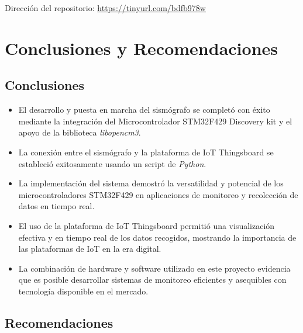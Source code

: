 \documentclass[12pt,a4paper]{article}
\begin{document}
Dirección del repositorio: \url{https://tinyurl.com/bdfb978w}


\newpage



\newpage



\newpage

\section{Conclusiones y Recomendaciones}

\subsection{Conclusiones}

\begin{itemize}

\item El desarrollo y puesta en marcha del sismógrafo se completó con éxito mediante la integración del Microcontrolador STM32F429 Discovery kit y el apoyo de la biblioteca \textit{libopencm3}.

\item La conexión entre el sismógrafo y la plataforma de IoT Thingsboard se estableció exitosamente usando un script de \textit{Python}.

\item La implementación del sistema demostró la versatilidad y potencial de los microcontroladores STM32F429 en aplicaciones de monitoreo y recolección de datos en tiempo real.

\item El uso de la plataforma de IoT Thingsboard permitió una visualización efectiva y en tiempo real de los datos recogidos, mostrando la importancia de las plataformas de IoT en la era digital.

\item La combinación de hardware y software utilizado en este proyecto evidencia que es posible desarrollar sistemas de monitoreo eficientes y asequibles con tecnología disponible en el mercado.


\end{itemize}

\subsection{Recomendaciones}
\end{document}
